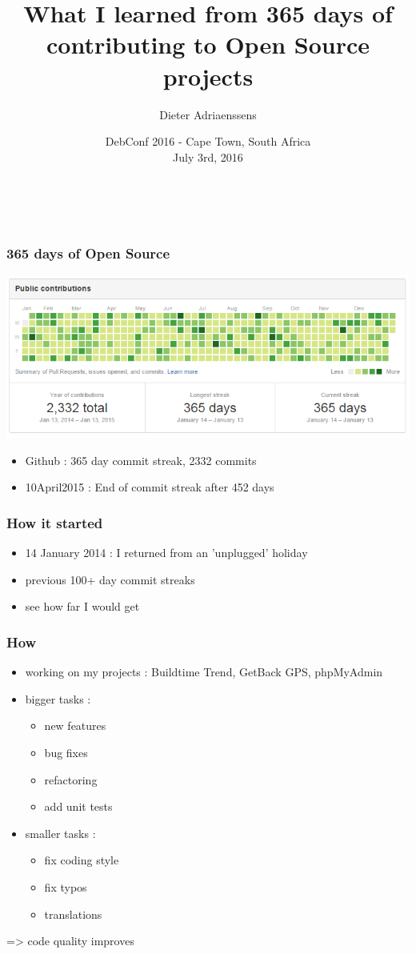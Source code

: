 \documentclass[14pt]{beamer}
\title[365 days of Open Source]{What I learned from 365 days of contributing to Open Source projects}
\author{Dieter Adriaenssens}
\institute[]{Open Source developer - @dcadriaenssens}
\date[DebConf16 3Jul2016]{DebConf 2016 - Cape Town, South Africa\\
July 3rd, 2016}
\begin{document}
  \begin{frame}
    \titlepage
    \vfill
    \begin{center}
      \\[2.5ex]
        {\tiny\CcNote{\CcLongnameByNcSa}}
        \vspace*{-2.5ex}
    \end{center}
  \end{frame}
  \begin{frame}
    \frametitle{365 days of Open Source}
    \includegraphics[scale=.45]{github_oss365_13jan2015.png}
    \begin{itemize}
      \item Github : 365 day commit streak, 2332 commits
      \item 10April2015 : End of commit streak after 452 days
    \end{itemize}
  \end{frame}
  \begin{frame}
    \frametitle{How it started}
    \begin{itemize}
      \item 14 January 2014 : I returned from an 'unplugged' holiday
      \item previous 100+ day commit streaks
      \item see how far I would get
    \end{itemize}
  \end{frame}
  \begin{frame}
    \frametitle{How}
    \begin{itemize}
      \item working on my projects : Buildtime Trend, GetBack GPS, phpMyAdmin
      \item bigger tasks :
      \begin{itemize}
        \item new features
        \item bug fixes
        \item refactoring
        \item add unit tests
      \end{itemize}
      \item smaller tasks :
      \begin{itemize}
        \item fix coding style
        \item fix typos
        \item translations
      \end{itemize}
    \end{itemize}
    => code quality improves
  \end{frame}
\end{document}
